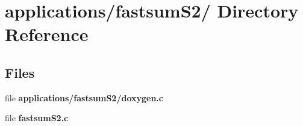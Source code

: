 \hypertarget{dir_000011}{
\section{applications/fastsum\-S2/ Directory Reference}
\label{dir_000011}
}
\subsection*{Files}
\begin{CompactItemize}
\item 
file {\bf applications/fastsum\-S2/doxygen.c}
\item 
file {\bf fastsum\-S2.c}
\end{CompactItemize}
